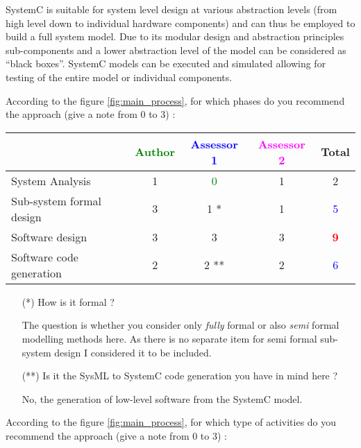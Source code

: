 SystemC is suitable for system level design at various abstraction levels (from high level down to individual hardware components) and can thus be employed to build a full system model. Due to its modular design and abstraction principles sub-components and a lower abstraction level of the model can be considered as ``black boxes''. SystemC models can be executed and simulated allowing for testing of the entire model or individual components.

According to the figure \ref{fig:main_process}, for which phases do you recommend the approach (give a note from 0 to 3) :

\begin{tabular}{|l | c | c | c | c|}
\hline
& \textcolor{green}{Author} & \textcolor{blue}{Assessor 1} & \textcolor{magenta}{Assessor 2} & Total \\
\hline
System Analysis &1 & \textcolor{green}{0} & 1    & 2    \\
\hline
Sub-system formal design & 3    & 1   *  &  1 & \textcolor{blue}{5} \\
\hline
Software design &3 &3 & 3    & \textcolor{red}{\textbf{9}} \\
\hline
Software code generation &2 & 2   ** & 2    & \textcolor{blue}{6} \\
\hline
\end{tabular}
\begin{assessor1}
\begin{itemize}
\item[(*)] How is it formal ?
\begin{author_comment}
The question is whether you consider only \emph{fully} formal or also \emph{semi} formal modelling methods here. As there is no separate item for semi formal sub-system design I considered it to be included.
\end{author_comment}
\item[(**)] Is it the SysML to  SystemC code generation  you have in
  mind here ?
\begin{author_comment}
No, the generation of low-level software from the SystemC model.
\end{author_comment}
\end{itemize}
\end{assessor1}

According to the figure \ref{fig:main_process}, for which type of activities do you recommend the approach (give a note from 0 to 3) :

